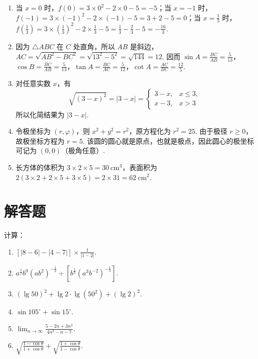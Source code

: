 \begin{solution}
\begin{enumerate}
\item 当 \(x=0\) 时，\(f(0)=3\times0^2-2\times0-5=-5\)；当 \(x=-1\) 时，\(f(-1)=3\times(-1)^2-2\times(-1)-5=3+2-5=0\)；当 \(x=\frac{1}{3}\) 时，\(f\left(\frac{1}{3}\right)=3\times\left(\frac{1}{3}\right)^2-2\times\frac{1}{3}-5=\frac{1}{3}-\frac{2}{3}-5=-\frac{16}{3}\).
\item 因为 \(\triangle ABC\) 在 \(C\) 处直角，所以 \(AB\) 是斜边，\(AC=\sqrt{AB^2-BC^2}=\sqrt{13^2-5^2}=\sqrt{144}=12\). 因而 \(\sin A=\frac{BC}{AB}=\frac{5}{13}\)，\(\cos B=\frac{BC}{AB}=\frac{5}{13}\)，\(\tan A=\frac{BC}{AC}=\frac{5}{12}\)，\(\cot A=\frac{AC}{BC}=\frac{12}{5}\).
\item 对任意实数 \(x\)，有
\[
\sqrt{(3-x)^2}=\left|3-x\right|=\begin{cases}
3-x,&x\leq3,\\
x-3,&x>3
\end{cases}
\]
所以化简结果为 \(\left|3-x\right|\).
\item 令极坐标为 \((r,\varphi)\)，则 \(x^2+y^2=r^2\)，原方程化为 \(r^2=25\). 由于极径 \(r\geq0\)，故极坐标方程为 \(r=5\). 该圆的圆心就是原点，也就是极点，因此圆心的极坐标可记为 \((0,0)\)（极角任意）.
\item 长方体的体积为 \(3\times2\times5=30\mathrm{~cm}^3\)，表面积为 \(2\left(3\times2+2\times5+3\times5\right)=2\times31=62\mathrm{~cm}^2\).
\end{enumerate}
\end{solution}

\section{解答题}

\begin{problem}
计算：

\begin{enumerate}
\item \(\left[\left|8-6\right|-\left|4-7\right|\right]\times\frac{1}{\left|1-2\right|}\).
\item \(a^{\frac{1}{2}}b^0\left(ab^2\right)^{-\frac{1}{2}}\div\left[b^{\frac{1}{3}}\left(a^3b^{-2}\right)^{-\frac{1}{3}}\right]\).
\item \(\left(\lg50\right)^2+\lg2\cdot\lg\left(50^2\right)+\left(\lg2\right)^2\).
\item \(\sin105^\circ+\sin15^\circ\).
\item \(\displaystyle\lim_{n\to\infty}\frac{5-2n+3n^2}{4n^2-n-7}\).
\item \(\sqrt{\frac{1-\cos\theta}{1+\cos\theta}}+\sqrt{\frac{1+\cos\theta}{1-\cos\theta}}\).
\end{enumerate}
\end{problem}

